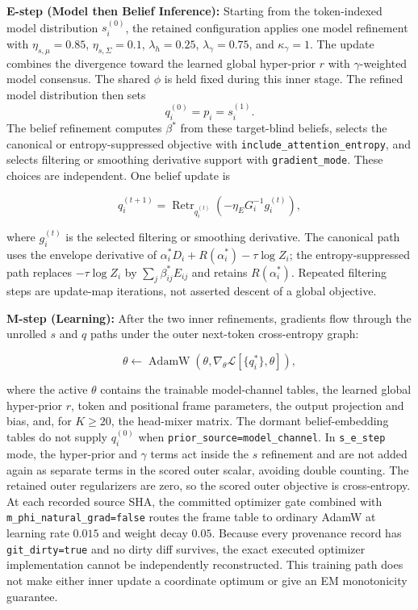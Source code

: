 \documentclass[twoside,11pt]{article}
\begin{document}
\textbf{E-step (Model then Belief Inference):} Starting from the token-indexed model distribution $s_i^{(0)}$, the retained configuration applies one model refinement with $\eta_{s,\mu}=0.85$, $\eta_{s,\Sigma}=0.1$, $\lambda_h=0.25$, $\lambda_\gamma=0.75$, and $\kappa_\gamma=1$. The update combines the divergence toward the learned global hyper-prior $r$ with $\gamma$-weighted model consensus. The shared $\phi$ is held fixed during this inner stage. The refined model distribution then sets
\begin{equation}
q_i^{(0)}=p_i=s_i^{(1)}.
\label{eq:model_channel_seed}
\end{equation}
The belief refinement computes $\beta^*$ from these target-blind beliefs, selects the canonical or entropy-suppressed objective with \texttt{include\_attention\_entropy}, and selects filtering or smoothing derivative support with \texttt{gradient\_mode}. These choices are independent. One belief update is

\begin{equation}
q_i^{(t+1)}
=\operatorname{Retr}_{q_i^{(t)}}
\left(-\eta_EG_i^{-1}g_i^{(t)}\right),
\end{equation}

where $g_i^{(t)}$ is the selected filtering or smoothing derivative. The canonical path uses the envelope derivative of $\alpha_i^*D_i+R(\alpha_i^*)-\tau\log Z_i$; the entropy-suppressed path replaces $-\tau\log Z_i$ by $\sum_j\beta_{ij}^*E_{ij}$ and retains $R(\alpha_i^*)$. Repeated filtering steps are update-map iterations, not asserted descent of a global objective.

\textbf{M-step (Learning):} After the two inner refinements, gradients flow through the unrolled $s$ and $q$ paths under the outer next-token cross-entropy graph:

\begin{equation}
\theta \leftarrow \operatorname{AdamW}\left(\theta,\nabla_{\theta}\mathcal{L}[\{q_i^*\},\theta]\right),
\end{equation}

where the active $\theta$ contains the trainable model-channel tables, the learned global hyper-prior $r$, token and positional frame parameters, the output projection and bias, and, for $K\geq20$, the head-mixer matrix. The dormant belief-embedding tables do not supply $q_i^{(0)}$ when \texttt{prior\_source=model\_channel}. In \texttt{s\_e\_step} mode, the hyper-prior and $\gamma$ terms act inside the $s$ refinement and are not added again as separate terms in the scored outer scalar, avoiding double counting. The retained outer regularizers are zero, so the scored outer objective is cross-entropy. At each recorded source SHA, the committed optimizer gate combined with \texttt{m\_phi\_natural\_grad=false} routes the frame table to ordinary AdamW at learning rate $0.015$ and weight decay $0.05$. Because every provenance record has \texttt{git\_dirty=true} and no dirty diff survives, the exact executed optimizer implementation cannot be independently reconstructed. This training path does not make either inner update a coordinate optimum or give an EM monotonicity guarantee.
\end{document}
